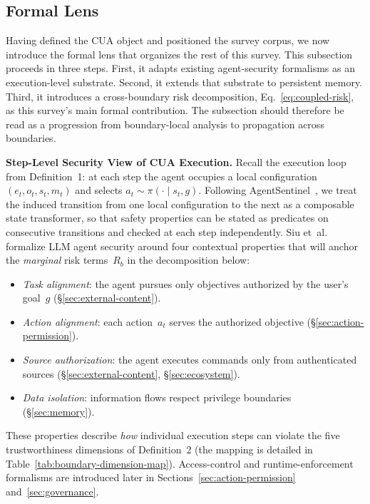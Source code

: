 \subsection{Formal Lens}
\label{sec:formal-framework}

Having defined the CUA object and positioned the survey corpus, we now introduce the formal lens that organizes the rest of this survey. This subsection proceeds in three steps. First, it adapts existing agent-security formalisms as an execution-level substrate. Second, it extends that substrate to persistent memory. Third, it introduces a cross-boundary risk decomposition, Eq.~\ref{eq:coupled-risk}, as this survey's main formal contribution. The subsection should therefore be read as a progression from boundary-local analysis to propagation across boundaries.

\smallskip
\noindent\textbf{Step-Level Security View of CUA Execution.}
Recall the execution loop from Definition~1: at each step the agent occupies a local configuration $(e_t, o_t, s_t, m_t)$ and selects $a_t \sim \pi(\cdot \mid s_t, g)$. Following AgentSentinel~\cite{agentsentinel2025}, we treat the induced transition from one local configuration to the next as a composable state transformer, so that safety properties can be stated as predicates on consecutive transitions and checked at each step independently. Siu et~al.~\cite{siu2026formalizing} formalize LLM agent security around four contextual properties that will anchor the \emph{marginal} risk terms~$R_b$ in the decomposition below:
\begin{itemize}[leftmargin=1.5em, nosep]
  \item \emph{Task alignment}: the agent pursues only objectives authorized by the user's goal~$g$ (\S\ref{sec:external-content}).
  \item \emph{Action alignment}: each action~$a_t$ serves the authorized objective (\S\ref{sec:action-permission}).
  \item \emph{Source authorization}: the agent executes commands only from authenticated sources (\S\ref{sec:external-content}, \S\ref{sec:ecosystem}).
  \item \emph{Data isolation}: information flows respect privilege boundaries (\S\ref{sec:memory}).
\end{itemize}
These properties describe \emph{how} individual execution steps can violate the five trustworthiness dimensions of Definition~2 (the mapping is detailed in Table~\ref{tab:boundary-dimension-map}). Access-control and runtime-enforcement formalisms are introduced later in Sections~\ref{sec:action-permission} and~\ref{sec:governance}.

